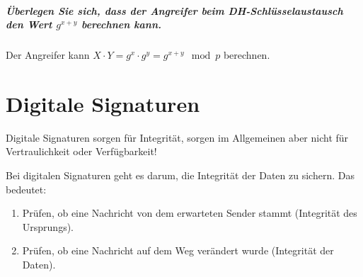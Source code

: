 		\paragraph{Überlegen Sie sich, dass der Angreifer beim DH-Schlüsselaustausch den Wert \(g^{x + y}\) berechnen kann.}
			Der Angreifer kann \( X \cdot Y = g ^ x \cdot g ^ y = g ^ {x+y} \mod p \) berechnen.

\chapter{Digitale Signaturen}
	Digitale Signaturen sorgen für Integrität, sorgen im Allgemeinen aber nicht für Vertraulichkeit oder Verfügbarkeit!

	Bei digitalen Signaturen geht es darum, die Integrität der Daten zu sichern. Das bedeutet:
	\begin{enumerate}
		\item Prüfen, ob eine Nachricht von dem erwarteten Sender stammt (Integrität des Ursprungs).
		\item Prüfen, ob eine Nachricht auf dem Weg verändert wurde (Integrität der Daten).
	\end{enumerate}

